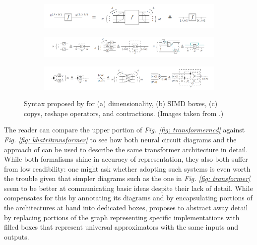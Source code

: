 \documentclass[11pt,a4paper,openright,twoside]{report}
\theoremstyle{plain}
\theoremstyle{definition}
\begin{document}
\begin{figure}[h]
  \begin{center}
    \begin{subfigure}{0.7\textwidth}
      \includegraphics[width=\textwidth]{figures/khatri_labels2.png}
      \caption{}
    \end{subfigure}  
    \begin{subfigure}{0.9\textwidth}
      \includegraphics[width=\textwidth]{figures/khatri_simd1.png}
      \caption{}
    \end{subfigure}    
    \begin{subfigure}{0.9\textwidth}
      \includegraphics[width=\textwidth]{figures/khatri_simd2.png}
      \caption{}
    \end{subfigure}    
    \caption[Dimensionality, SIMD boxes, and syntactic sugar]{Syntax proposed by \cite{khatri2024anatomy} for (a) dimensionality, (b) SIMD boxes, (c) copys, reshape operators, and contractions. (Images taken from \cite{khatri2024anatomy}.)}
    \label{fig: khatridiagrams}
  \end{center}
\end{figure}

The reader can compare the upper portion of \textit{Fig. \ref{fig: transformerncd}} against \textit{Fig. \ref{fig: khatritransformer}} to see how both neural circuit diagrams and the approach of \cite{khatri2024anatomy} can be used to describe the same transformer architecture in detail. While both formalisms shine in accuracy of representation, they also both suffer from low readibility: one might ask whether adopting such systems is even worth the trouble given that simpler diagrams such as the one in \textit{Fig. \ref{fig: transformer}} seem to be better at communicating basic ideas despite their lack of detail. 
While \cite{abbott2023robust} compensates for this by annotating its diagrams and by encapsulating portions of the architectures at hand into dedicated boxes, \cite{khatri2024anatomy} proposes to abstract away detail by replacing portions of the graph representing specific implementations with filled boxes that represent universal approximators with the same inputs and outputs.
\end{document}
